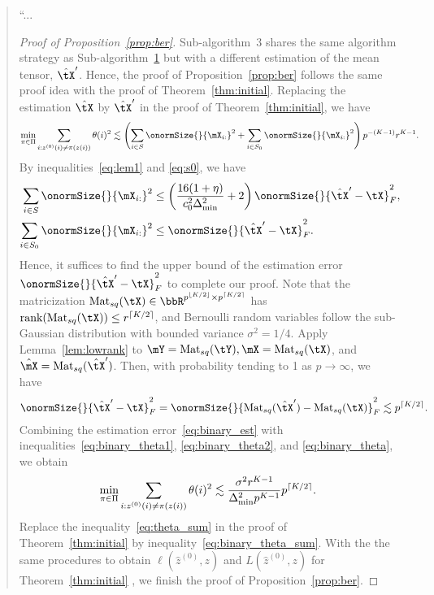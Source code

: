 \documentclass[11pt]{article}
\theoremstyle{definition}
\theoremstyle{definition}
\newcommand{\of}[1]{\left(#1\right)}
\newcommand{\Mat}{\text{Mat}}
\DeclarePairedDelimiter{\ceil}{\lceil}{\rceil}
\DeclarePairedDelimiter{\floor}{\lfloor}{\rfloor}
\begin{document}
\begin{enumerate}
\begin{enumerate}[wide]
        \begin{quote}
            
``... \begin{proof}[Proof of Proposition~\ref{prop:ber}] Sub-algorithm~3 shares the same algorithm strategy as Sub-algorithm~\hyperref[alg:main]{1} but with a different estimation of the mean tensor, $\hat \tX'$. Hence, the proof of Proposition~\ref{prop:ber} follows the same proof idea with the proof of Theorem~\ref{thm:initial}. Replacing the estimation $\hat \tX$ by $\hat \tX'$ in the proof of Theorem~\ref{thm:initial}, we have 
\begin{align}
        \min_{\pi \in \Pi} \sum_{i : z^{(0)}(i) \neq \pi(z(i))} \theta(i)^2  &\lesssim \of{\sum_{i \in S} \onormSize{}{\mX_{i:}}^2 + \sum_{i \in S_0} \onormSize{}{\mX_{i:}}^2  } p^{-(K-1)} r^{K-1}. \label{eq:binary_theta}
    \end{align}
By inequalities~\eqref{eq:lem1} and \eqref{eq:s0}, we have 
\begin{align}
   \sum_{i \in S} \onormSize{}{\mX_{i:}}^2 &\leq  \of{ \frac{16(1 + \eta)}{c_0^2 \Delta_{\min}^2 } + 2 }\onormSize{}{\hat \tX' - \tX}_F^2, \label{eq:binary_theta1}  \\
   \sum_{i \in S_0} \onormSize{}{\mX_{i:}}^2 &\leq  \onormSize{}{\hat \tX' - \tX}_F^2. \label{eq:binary_theta2}
\end{align}
Hence, it suffices to find the upper bound of the estimation error $\onormSize{}{\hat \tX' - \tX}_F^2$ to complete our proof. Note that the matricization $\Mat_{sq}(\tX) \in \bbR^{p^{\floor{K/2}} \times p^{\ceil{K/2}}}$ has $\text{rank}(\Mat_{sq}(\tX)) \leq r^{\ceil{K/2}}$, and Bernoulli random variables follow the sub-Gaussian distribution with bounded variance $\sigma^2 = 1/4$. Apply Lemma~\ref{lem:lowrank} to $\mY = \Mat_{sq}(\tY), \mX = \Mat_{sq}(\tX)$, and $\hat \mX = \Mat_{sq}(\hat \tX')$. Then, with probability tending to 1 as $ p \rightarrow \infty$, we have 
        \begin{equation}\label{eq:binary_est}
            \onormSize{}{\hat \tX' - \tX}_F^2 = \onormSize{}{\Mat_{sq}(\hat \tX') - \Mat_{sq}(\tX)}_F^2 \lesssim p^{\ceil{K/2}}.
        \end{equation}
Combining the estimation error~\eqref{eq:binary_est} with inequalities~\eqref{eq:binary_theta1}, \eqref{eq:binary_theta2}, and \eqref{eq:binary_theta}, we obtain 
\begin{equation}\label{eq:binary_theta_sum}
    \min_{\pi \in \Pi} \sum_{i : z^{(0)}(i) \neq \pi(z(i))} \theta(i)^2 \lesssim  \frac{\sigma^2 r^{K-1}}{ \Delta_{\min}^2  p^{K-1} } p^{\ceil{K/2}}.
\end{equation}
Replace the inequality~\eqref{eq:theta_sum} in the proof of Theorem~\ref{thm:initial} by inequality~\eqref{eq:binary_theta_sum}. With the the same procedures to obtain $\ell(\hat z^{(0)}, z)$ and $L(\hat z^{(0)}, z)$ for Theorem~\ref{thm:initial} , we finish the proof of Proposition~\ref{prop:ber}.
\end{proof}


\end{quote}
\end{enumerate}
\end{enumerate}
\end{document}
